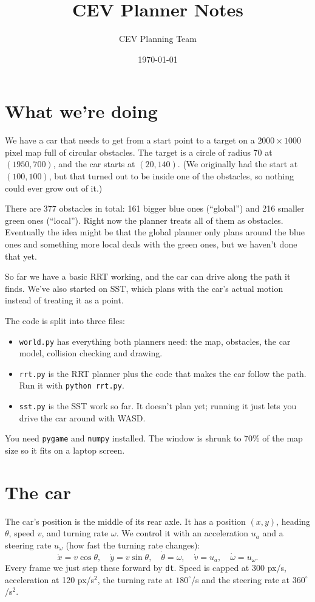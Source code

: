 \documentclass[11pt]{article}
\title{CEV Planner Notes}
\author{CEV Planning Team}
\date{\today}
\newcommand{\code}[1]{\texttt{#1}}
\begin{document}
\maketitle

\section{What we're doing}

We have a car that needs to get from a start point to a target on a $2000 \times 1000$ pixel map
full of circular obstacles. The target is a circle of radius 70 at $(1950, 700)$, and the car starts at
$(20, 140)$. (We originally had the start at $(100, 100)$, but that turned out to be inside one of the
obstacles, so nothing could ever grow out of it.)

There are 377 obstacles in total: 161 bigger blue ones (``global'') and 216 smaller green ones
(``local''). Right now the planner treats all of them as obstacles. Eventually the idea might be that
the global planner only plans around the blue ones and something more local deals with the green ones,
but we haven't done that yet.

So far we have a basic RRT working, and the car can drive along the path it finds. We've also started
on SST, which plans with the car's actual motion instead of treating it as a point.

The code is split into three files:
\begin{itemize}
  \item \code{world.py} has everything both planners need: the map, obstacles, the car model, collision
    checking and drawing.
  \item \code{rrt.py} is the RRT planner plus the code that makes the car follow the path.
    Run it with \code{python rrt.py}.
  \item \code{sst.py} is the SST work so far. It doesn't plan yet; running it just lets you drive the car
    around with WASD.
\end{itemize}
You need \code{pygame} and \code{numpy} installed. The window is shrunk to 70\% of the map size so it fits
on a laptop screen.

\section{The car}

The car's position is the middle of its rear axle. It has a position $(x, y)$, heading $\theta$, speed
$v$, and turning rate $\omega$. We control it with an acceleration $u_a$ and a steering rate $u_\omega$
(how fast the turning rate changes):
\[
  \dot x = v\cos\theta, \quad \dot y = v\sin\theta, \quad \dot\theta = \omega, \quad
  \dot v = u_a, \quad \dot\omega = u_\omega.
\]
Every frame we just step these forward by \code{dt}. Speed is capped at 300 px/s, acceleration at
120 px/s$^2$, the turning rate at $180^\circ$/s and the steering rate at $360^\circ$/s$^2$.
\end{document}
